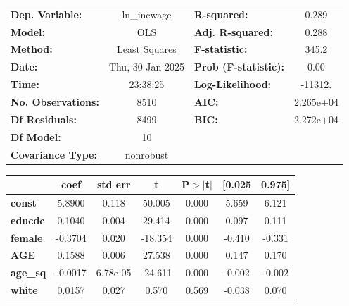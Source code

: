 \documentclass[
  letterpaper,
  DIV=11,
  numbers=noendperiod]{scrartcl}
\begin{document}
\begin{center}
\begin{tabular}{lclc}
\toprule
\textbf{Dep. Variable:}    &   ln\_incwage    & \textbf{  R-squared:         } &     0.289   \\
\textbf{Model:}            &       OLS        & \textbf{  Adj. R-squared:    } &     0.288   \\
\textbf{Method:}           &  Least Squares   & \textbf{  F-statistic:       } &     345.2   \\
\textbf{Date:}             & Thu, 30 Jan 2025 & \textbf{  Prob (F-statistic):} &     0.00    \\
\textbf{Time:}             &     23:38:25     & \textbf{  Log-Likelihood:    } &   -11312.   \\
\textbf{No. Observations:} &        8510      & \textbf{  AIC:               } & 2.265e+04   \\
\textbf{Df Residuals:}     &        8499      & \textbf{  BIC:               } & 2.272e+04   \\
\textbf{Df Model:}         &          10      & \textbf{                     } &             \\
\textbf{Covariance Type:}  &    nonrobust     & \textbf{                     } &             \\
\bottomrule
\end{tabular}
\begin{tabular}{lcccccc}
                  & \textbf{coef} & \textbf{std err} & \textbf{t} & \textbf{P$> |$t$|$} & \textbf{[0.025} & \textbf{0.975]}  \\
\midrule
\textbf{const}    &       5.8900  &        0.118     &    50.005  &         0.000        &        5.659    &        6.121     \\
\textbf{educdc}   &       0.1040  &        0.004     &    29.414  &         0.000        &        0.097    &        0.111     \\
\textbf{female}   &      -0.3704  &        0.020     &   -18.354  &         0.000        &       -0.410    &       -0.331     \\
\textbf{AGE}      &       0.1588  &        0.006     &    27.538  &         0.000        &        0.147    &        0.170     \\
\textbf{age\_sq}  &      -0.0017  &     6.78e-05     &   -24.611  &         0.000        &       -0.002    &       -0.002     \\
\textbf{white}    &       0.0157  &        0.027     &     0.570  &         0.569        &       -0.038    &        0.070     \\

\end{tabular}
\end{center}
\end{document}
